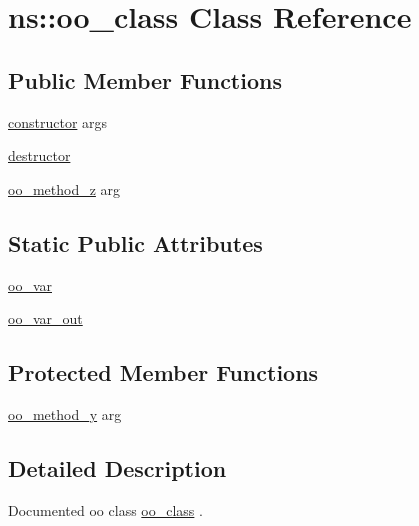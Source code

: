 \hypertarget{classns_1_1oo__class}{\section{ns\-:\-:oo\-\_\-class Class Reference}
\label{classns_1_1oo__class}
}
\subsection*{Public Member Functions}
\begin{DoxyCompactItemize}
\item 
\hyperlink{classns_1_1oo__class_aa26b64151d4b4b0e8b4977aae7048f9b}{constructor} args
\item 
\hyperlink{classns_1_1oo__class_af148cfc1c090a05986c68ac9452a510a}{destructor}
\item 
\hyperlink{classns_1_1oo__class_a8a3cfbae3b3fca463f08adb9174a5fe8}{oo\-\_\-method\-\_\-z} arg
\end{DoxyCompactItemize}
\subsection*{Static Public Attributes}
\begin{DoxyCompactItemize}
\item 
\hyperlink{classns_1_1oo__class_a741f11f4a2db3876205658d4a9a279ba}{oo\-\_\-var}
\item 
\hyperlink{classns_1_1oo__class_af46293ede16067c38ca2901416cad8ee}{oo\-\_\-var\-\_\-out}
\end{DoxyCompactItemize}
\subsection*{Protected Member Functions}
\begin{DoxyCompactItemize}
\item 
\hyperlink{classns_1_1oo__class_ad07feb192f34010ed66d123338c7acdd}{oo\-\_\-method\-\_\-y} arg
\end{DoxyCompactItemize}


\subsection{Detailed Description}
Documented oo class {\ttfamily \hyperlink{classns_1_1oo__class}{oo\-\_\-class}} . 

